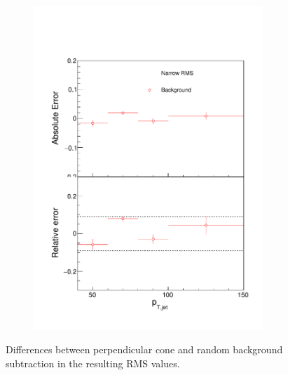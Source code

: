 \begin{figure}
\begin{subfigure}{0.24\textwidth}
\includegraphics[width=0.95\textwidth]{results/SystematicErrors/SystematicErrorsGausRMS_BgNFin00JetPt08_linx_data}
\end{subfigure}
\caption{Differences between perpendicular cone and random background subtraction in the resulting RMS values.}
\label{fig:systbg}
\end{figure}

